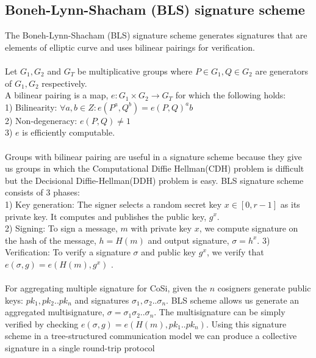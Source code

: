 \subsection{Boneh-Lynn-Shacham (BLS) signature scheme}
The  Boneh-Lynn-Shacham (BLS) signature scheme \cite{bls} generates signatures that are elements of elliptic curve and uses bilinear pairings for verification.\\\\
Let $G_1, G_2$ and $G_T$ be multiplicative groups where $P \in G_1, Q \in G_2$ are generators of $G_1, G_2$ respectively.\\
A bilinear pairing is a map, $e: G_1 \times G_2 \rightarrow G_T$ for which the following holds:\\
1) Bilinearity: $\forall a, b \in Z: e(P^a, Q^b) = e(P, Q)^ab$\\
2) Non-degeneracy: $e(P, Q) \not= 1$\\
3) $e$ is efficiently computable.\\
\\
Groups with bilinear pairing are useful in a signature scheme because they give us groups in which the Computational Diffie Hellman(CDH) problem is difficult but the Decisional Diffie-Hellman(DDH) problem is easy. BLS signature scheme consists of 3 phases:\\
1) Key generation: The signer selects a random secret key $x \in [0, r-1]$ as its private key. It computes and publishes the public key, $g^x$.\\
2) Signing: To sign a message, $m$ with private key $x$, we compute signature on the hash of the message, $h = H(m)$ and output signature, $\sigma = h^x$.
3) Verification: To verify a signature $\sigma$ and public key $g^x$, we verify that $e(\sigma, g) = e(H(m), g^x)$ .\\\\
For aggregating multiple signature for CoSi, given the $n$ cosigners generate public keys: $pk_1,pk_2..pk_n$ and signatures $\sigma_1, \sigma_2..\sigma_n$. BLS scheme allows us generate an aggregated multisignature, $\sigma = \sigma_1 \sigma_2..\sigma_n$. The multisignature can be simply verified by checking $e(\sigma, g) = e(H(m), pk_1..pk_n)$.
Using this signature scheme in a tree-structured communication model we can produce a collective signature in a single round-trip protocol

\clearpage